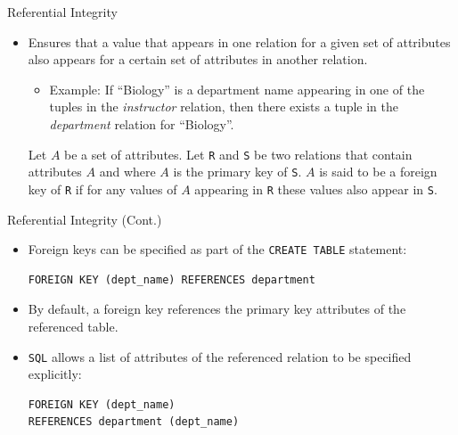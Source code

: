 \documentclass{beamer}
\begin{document}
\begin{frame}{Referential Integrity}
    \begin{itemize}
        \item Ensures that a value that appears in one relation for a given set of attributes also appears for a certain set of attributes in another relation.
        \begin{itemize}
            \item Example: If ``Biology'' is a department name appearing in one of the tuples in the \textit{instructor} relation, then there exists a tuple in the \textit{department} relation for ``Biology''.
        \end{itemize}
        Let $A$ be a set of attributes. Let \texttt{R} and \texttt{S} be two relations that contain attributes $A$ and where $A$ is the primary key of \texttt{S}.  $A$ is said to be a foreign key of \texttt{R} if for any values of $A$ appearing in \texttt{R} these values also appear in \texttt{S}.
    \end{itemize}
\end{frame}

\begin{frame}[fragile]{Referential Integrity (Cont.)}
    \begin{itemize}
        \item Foreign keys can be specified as part of the \texttt{CREATE TABLE} statement:
            \begin{verbatim}
FOREIGN KEY (dept_name) REFERENCES department 
            \end{verbatim}
        \item By default, a foreign key references the primary key attributes of the referenced table.
        \item \texttt{SQL} allows a list of attributes of the referenced relation to be specified explicitly:
            \begin{verbatim}
FOREIGN KEY (dept_name) 
REFERENCES department (dept_name)
            \end{verbatim}
    \end{itemize}
\end{frame}
\end{document}
